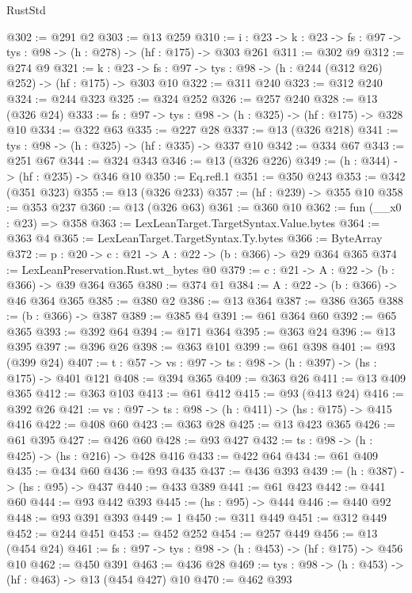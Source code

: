 \begin{lexlean}{RustStd}
\begin{coremodule}
@302 := @291 @2
@303 := @13 @259
@310 := {i : @23} ->
  {k : @23} -> {fs : @97} -> {tys : @98} -> (h : @278) -> (hf : @175) -> @303 @261
@311 := @302 @9
@312 := @274 @9
@321 := {k : @23} ->
  {fs : @97} -> {tys : @98} -> (h : @244 (@312 @26) @252) -> (hf : @175) -> @303 @10
@322 := @311 @240
@323 := @312 @240
@324 := @244 @323
@325 := @324 @252
@326 := @257 @240
@328 := @13 (@326 @24)
@333 := {fs : @97} -> {tys : @98} -> (h : @325) -> (hf : @175) -> @328 @10
@334 := @322 @63
@335 := @227 @28
@337 := @13 (@326 @218)
@341 := {tys : @98} -> (h : @325) -> (hf : @335) -> @337 @10
@342 := @334 @67
@343 := @251 @67
@344 := @324 @343
@346 := @13 (@326 @226)
@349 := (h : @344) -> (hf : @235) -> @346 @10
@350 := Eq.refl.{1}
@351 := @350 @243
@353 := @342 (@351 @323)
@355 := @13 (@326 @233)
@357 := (hf : @239) -> @355 @10
@358 := @353 @237
@360 := @13 (@326 @63)
@361 := @360 @10
@362 := fun (__x0 : @23) => @358
@363 := LexLeanTarget.TargetSyntax.Value.bytes
@364 := @363 @4
@365 := LexLeanTarget.TargetSyntax.Ty.bytes
@366 := ByteArray
@372 := {p : @20} -> {c : @21} -> {A : @22} -> (b : @366) -> @29 @364 @365
@374 := LexLeanPreservation.Rust.wt_bytes @0
@379 := {c : @21} -> {A : @22} -> (b : @366) -> @39 @364 @365
@380 := @374 @1
@384 := {A : @22} -> (b : @366) -> @46 @364 @365
@385 := @380 @2
@386 := @13 @364
@387 := @386 @365
@388 := (b : @366) -> @387
@389 := @385 @4
@391 := @61 @364 @60
@392 := @65 @365
@393 := @392 @64
@394 := @171 @364
@395 := @363 @24
@396 := @13 @395
@397 := @396 @26
@398 := @363 @101
@399 := @61 @398
@401 := @93 (@399 @24)
@407 := {t : @57} -> {vs : @97} -> {ts : @98} -> (h : @397) -> (hs : @175) -> @401 @121
@408 := @394 @365
@409 := @363 @26
@411 := @13 @409 @365
@412 := @363 @103
@413 := @61 @412
@415 := @93 (@413 @24)
@416 := @392 @26
@421 := {vs : @97} -> {ts : @98} -> (h : @411) -> (hs : @175) -> @415 @416
@422 := @408 @60
@423 := @363 @28
@425 := @13 @423 @365
@426 := @61 @395
@427 := @426 @60
@428 := @93 @427
@432 := {ts : @98} -> (h : @425) -> (hs : @216) -> @428 @416
@433 := @422 @64
@434 := @61 @409
@435 := @434 @60
@436 := @93 @435
@437 := @436 @393
@439 := (h : @387) -> (hs : @95) -> @437
@440 := @433 @389
@441 := @61 @423
@442 := @441 @60
@444 := @93 @442 @393
@445 := (hs : @95) -> @444
@446 := @440 @92
@448 := @93 @391 @393
@449 := 1
@450 := @311 @449
@451 := @312 @449
@452 := @244 @451
@453 := @452 @252
@454 := @257 @449
@456 := @13 (@454 @24)
@461 := {fs : @97} -> {tys : @98} -> (h : @453) -> (hf : @175) -> @456 @10
@462 := @450 @391
@463 := @436 @28
@469 := {tys : @98} -> (h : @453) -> (hf : @463) -> @13 (@454 @427) @10
@470 := @462 @393

\end{coremodule}
\end{lexlean}

